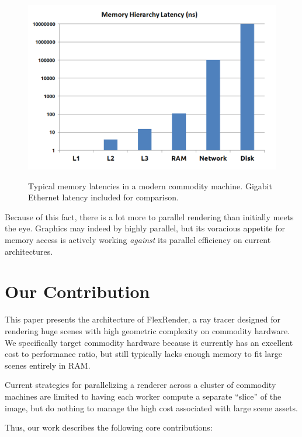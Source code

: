 \documentclass[12pt]{ucthesis}
\newcommand{\captionfonts}{\small\bf\ssp}
\begin{document}
\begin{figure}[h!]
    \centering
    \includegraphics[width=140mm]{figures/memorylatency.png}
    \captionfonts
    \caption{Typical memory latencies in a modern commodity machine. Gigabit Ethernet latency included for comparison.}
    \label{fig:memlatency}
\end{figure}

Because of this fact, there is a lot more to parallel rendering than initially
meets the eye. Graphics may indeed by highly parallel, but its voracious appetite
for memory access is actively working \emph{against} its parallel efficiency on
current architectures.

\section{Our Contribution}
\label{contribution}

This paper presents the architecture of FlexRender, a ray tracer designed for
rendering huge scenes with high geometric complexity on commodity hardware. We
specifically target commodity hardware because it currently has an excellent
cost to performance ratio, but still typically lacks enough memory to fit large
scenes entirely in RAM.

Current strategies for parallelizing a renderer across a cluster of commodity
machines are limited to having each worker compute a separate ``slice'' of the
image, but do nothing to manage the high cost associated with large scene
assets.

Thus, our work describes the following core contributions:
\end{document}
